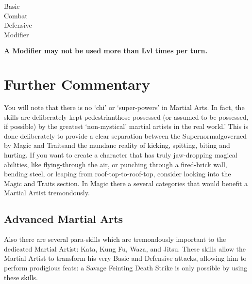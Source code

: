 \documentclass[twoside]{book}
\begin{document}
\begin{description}
    
  \item[ Basic ] 
  \item[ Combat ] 
  \item[ Defensive ] 
  \item[ Modifier ] 
\end{description}
  

 \textbf{ A Modifier may not be used more than Lvl times per
             turn. }


  

  

  
    

\section{Further Commentary}
      You will note that there is no `chi' or
             `super-powers' in Martial Arts. In fact, the
             skills are deliberately kept pedestrianthose
             possessed (or assumed to be possessed, if possible) by the
             greatest `non-mystical' martial artists in the
             real world.' This is done deliberately to
             provide a clear separation between the
             Supernormalgoverned by Magic and Traitsand the
             mundane reality of kicking, spitting, biting and hurting. If
             you want to create a character that has truly jaw-dropping
             magical abilities, like flying-through the air, or punching
             through a fired-brick wall, bending steel, or leaping from
             roof-top-to-roof-top, consider looking into the Magic and
             Traits section. In Magic there a several categories that
             would benefit a Martial Artist tremondously. 
    

\subsection{Advanced Martial Arts}
      Also there are several para-skills which are
               tremondously important to the dedicated Martial Artist:
               Kata, Kung Fu, Waza, and Jitsu. These skills allow the
               Martial Artist to transform his very Basic and Defensive
               attacks, allowing him to perform prodigious feats: a
               Savage Feinting Death Strike is only possible by using
               these skills. 
    
\end{document}
